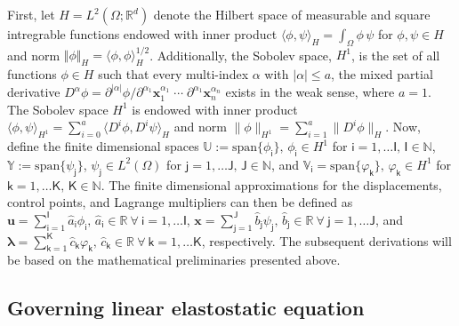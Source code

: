 First, let  $H= L^2(\Omega;\mathbb{R}^d)$ denote the Hilbert space of  measurable and square intregrable functions endowed with inner product $\langle\phi,\psi\rangle_H=\int_{\Omega}\phi\,\psi$ for $\phi,\psi\in H$ and norm $\Vert\phi\Vert_H = \langle\phi,\phi\rangle_H^{1/2}$. Additionally, the Sobolev space, $H^1$, is the set of all functions $\phi\in{H}$ such that every multi-index $\alpha$ with $|\alpha|\leq{a}$, the mixed partial derivative $D^{\alpha}\phi=\partial^{|\alpha|}\phi / \partial^{\alpha_1}\bm x_{1}^{\alpha_{1}}\; \cdots\;\partial^{\alpha_1}\bm x_n^{\alpha_n}$ exists in the weak sense, where $a=1$. The Sobolev space $H^1$ is endowed with inner product $\langle\phi,\psi\rangle_{H^1}=\sum_{i=0}^{a}\langle{D}^{i}\phi,{D}^{i}\psi\rangle_{H}$ and norm $\|\phi\|_{H^1}=\sum_{i=1}^a\|D^i\phi\|_{H}$. Now, define the finite dimensional spaces $\mathbb{U}:=\mbox{span}\{\phi_{\mathsf{i}}\},\, \phi_{\mathsf{i}}\in{H}^{1}$ for $\mathsf{i}=1,\dots \mathsf{I},\, \mathsf{I}\in\mathbb{N}$, $\mathbb{Y}:=\mbox{span}\{\psi_\mathsf{j}\}$, $\psi_\mathsf{j}\in L^2(\Omega)$ for $\mathsf{j}=1,\dots \mathsf{J},\, \mathsf{J}\in\mathbb{N}$, and $\mathbb{V}_{\mathsf{i}}=\mbox{span}\{\varphi_{\mathsf{k}}\},\, \varphi_{\mathsf{k}}\in{H}^{1}$ for $\mathsf{k}=1,\dots \mathsf{K},\, \mathsf{K}\in\mathbb{N}$. The finite dimensional approximations for the displacements, control points, and Lagrange multipliers can then be defined as $\bm{u}=\sum_{\mathsf{i}=1}^\mathsf{I}\hat{a}_\mathsf{i}\phi_\mathsf{i},\,  \hat{a}_\mathsf{i}\in\mathbb{R}\ \forall\ \mathsf{i}=1,\dots \mathsf{I}$, $\bm{x}=\sum_{\mathsf{j}=1}^\mathsf{J}\hat{b}_{\mathsf{j}}\psi_\mathsf{j},\, \hat{b}_{\mathsf{j}}\in\mathbb{R}\ \forall\ \mathsf{j}=1,\dots \mathsf{J}$, and $\bm{\lambda}=\sum_{\mathsf{k}=1}^\mathsf{K}\hat{c}_\mathsf{k}\varphi_{\mathsf{k}},\, \hat{c}_\mathsf{k}\in\mathbb{R}\ \forall\ \mathsf{k}=1,\dots \mathsf{K}$, respectively. The subsequent derivations will be based on the mathematical preliminaries presented above. 

\subsection{Governing linear elastostatic equation}

